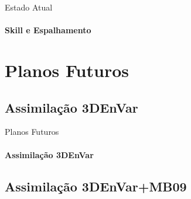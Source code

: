 \documentclass[10pt,aspectratio=169]{beamer}
\begin{document}
\begin{frame}{Estado Atual}
	\framesubtitle{Skill e Espalhamento}
\begin{figure}[H]
    \centering
        \pause
        \caption{}
\end{figure}
\end{frame}

\section{Planos Futuros}

\subsection{Assimilação 3DEnVar}

\begin{frame}{Planos Futuros}
\framesubtitle{Assimilação 3DEnVar}
\vspace{-0.75em}
\begin{figure}[t]
  \centering
  
\end{figure}
\end{frame}

\subsection{Assimilação 3DEnVar+MB09}
\end{document}
